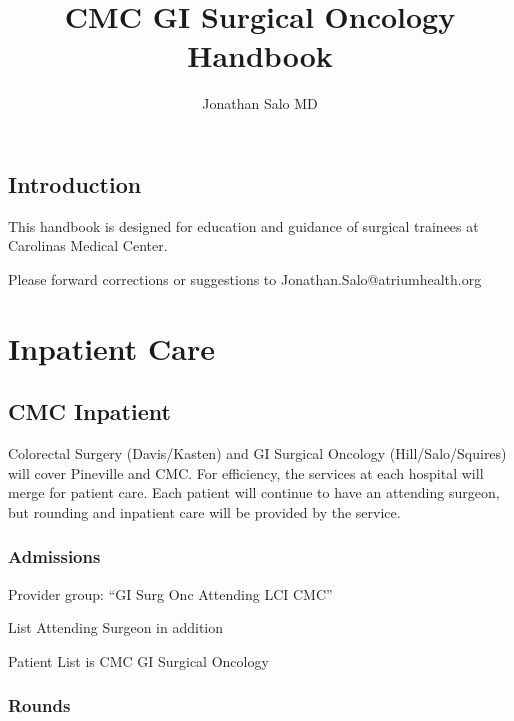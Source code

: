\documentclass[
  letterpaper,
]{scrbook}
\title{CMC GI Surgical Oncology Handbook}
\author{Jonathan Salo MD}
\date{}
\renewcommand*\contentsname{Table of contents}
\newcommand\contentsname{Table of contents}
\begin{document}
\frontmatter
\maketitle

\renewcommand*\contentsname{Table of contents}
{
\setcounter{tocdepth}{2}
\tableofcontents
}

\mainmatter
{}

\chapter*{Introduction}\label{introduction}


This handbook is designed for education and guidance of surgical
trainees at Carolinas Medical Center.

Please forward corrections or suggestions to
Jonathan.Salo@atriumhealth.org

\part{Inpatient Care}

\chapter{CMC Inpatient}\label{cmc-inpatient}

Colorectal Surgery (Davis/Kasten) and GI Surgical Oncology
(Hill/Salo/Squires) will cover Pineville and CMC. For efficiency, the
services at each hospital will merge for patient care. Each patient will
continue to have an attending surgeon, but rounding and inpatient care
will be provided by the service.

\section{Admissions}\label{admissions}

Provider group: ``GI Surg Onc Attending LCI CMC''

List Attending Surgeon in addition

Patient List is CMC GI Surgical Oncology

\section{Rounds}\label{rounds}
\end{document}
